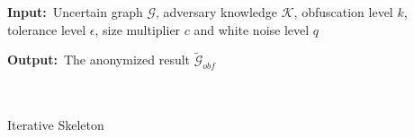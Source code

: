 \begin{algorithm}
	\begin{algorithmic}[1]
    	\item[] {\textbf{Input:}~Uncertain graph $\mathcal{G}$, adversary knowledge $\mathcal{K}$, obfuscation level $k$, tolerance level $\epsilon$, size multiplier $c$ and white noise level $q$ }
        \item[] {\textbf{Output:}~The anonymized result $\tilde{\mathcal{G}}_{obf}$}
     	 \\
        \REPEAT
         \\
         \\
        \REPEAT
    	\caption{\SysName Iterative Skeleton}
	 \label{alg:Skeleton}
    \end{algorithmic}
\end{algorithm}
\vspace{-5pt}
